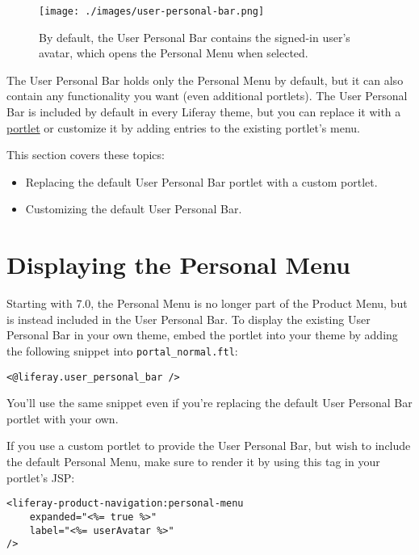 \begin{figure}
\centering
\texttt{[image: ./images/user-personal-bar.png]}
\caption{By default, the User Personal Bar contains the signed-in user's
avatar, which opens the Personal Menu when selected.}
\end{figure}

The User Personal Bar holds only the Personal Menu by default, but it
can also contain any functionality you want (even additional portlets).
The User Personal Bar is included by default in every Liferay theme, but
you can replace it with a
\href{/docs/7-2/customization/-/knowledge_base/c/using-a-custom-portlet-in-place-of-the-user-personal-bar}{portlet}
or customize it by adding entries to the existing portlet's menu.

This section covers these topics:

\begin{itemize}
\tightlist
\item
  Replacing the default User Personal Bar portlet with a custom portlet.
\item
  Customizing the default User Personal Bar.
\end{itemize}

\section{Displaying the Personal
Menu}\label{displaying-the-personal-menu}

Starting with 7.0, the Personal Menu is no longer part of the Product
Menu, but is instead included in the User Personal Bar. To display the
existing User Personal Bar in your own theme, embed the portlet into
your theme by adding the following snippet into
\texttt{portal\_normal.ftl}:

\begin{verbatim}
<@liferay.user_personal_bar />
\end{verbatim}

You'll use the same snippet even if you're replacing the default User
Personal Bar portlet with your own.

If you use a custom portlet to provide the User Personal Bar, but wish
to include the default Personal Menu, make sure to render it by using
this tag in your portlet's JSP:

\begin{verbatim}
<liferay-product-navigation:personal-menu
    expanded="<%= true %>"
    label="<%= userAvatar %>"
/>
\end{verbatim}

